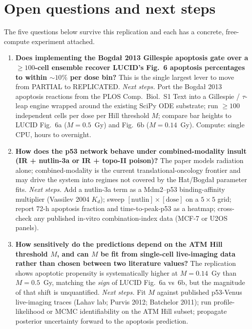 \section{Open questions and next steps}

The five questions below survive this replication and each has a concrete,
free-compute experiment attached.

\begin{enumerate}
  \item \textbf{Does implementing the Bogda\l{} 2013 Gillespie apoptosis gate
        over a $\geq 100$-cell ensemble recover LUCID's Fig.~6 apoptosis
        percentages to within $\sim 10\%$ per dose bin?}
        This is the single largest lever to move from PARTIAL to REPLICATED.
        \emph{Next steps.} Port the Bogda\l{} 2013 apoptosis reactions from
        the PLOS Comp.\ Biol.\ S1 Text into a Gillespie / $\tau$-leap engine
        wrapped around the existing SciPy ODE substrate; run $\geq 100$
        independent cells per dose per Hill threshold $M$; compare bar
        heights to LUCID Fig.~6a ($M=0.5$~Gy) and Fig.~6b ($M=0.14$~Gy).
        Compute: single CPU, hours to overnight.

  \item \textbf{How does the p53 network behave under combined-modality
        insult (IR + nutlin-3a or IR + topo-II poison)?}
        The paper models radiation alone; combined-modality is the current
        translational-oncology frontier and may drive the system into
        regimes not covered by the Hat/Bogda\l{} parameter fits.
        \emph{Next steps.} Add a nutlin-3a term as a Mdm2--p53 binding-affinity
        multiplier (Vassilev 2004 $K_d$); sweep $[\mathrm{nutlin}] \times
        [\mathrm{dose}]$ on a $5\times5$ grid; report 72-h apoptosis fraction
        and time-to-peak-p53 as a heatmap; cross-check any published in-vitro
        combination-index data (MCF-7 or U2OS panels).

  \item \textbf{How sensitively do the predictions depend on the ATM Hill
        threshold $M$, and can $M$ be fit from single-cell live-imaging data
        rather than chosen between two literature values?}
        The replication shows apoptotic propensity is systematically higher
        at $M=0.14$~Gy than $M=0.5$~Gy, matching the \emph{sign} of LUCID
        Fig.~6a vs~6b, but the magnitude of that shift is unquantified.
        \emph{Next steps.} Fit $M$ against published p53-Venus live-imaging
        traces (Lahav lab; Purvis 2012; Batchelor 2011); run profile-likelihood
        or MCMC identifiability on the ATM Hill subset; propagate posterior
        uncertainty forward to the apoptosis prediction.


\end{enumerate}
